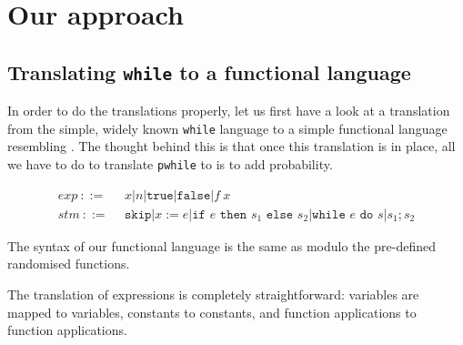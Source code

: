 \documentclass[11pt, leqno]{article}
\theoremstyle{definition}
\begin{document}




\section{Our approach}





\subsection{Translating \texttt{while} to a functional language}
% 
In order to do the translations properly, let us first have a look at a translation
from the simple, widely known \texttt{while} language to a simple functional language
resembling \rml. The thought behind this is that once this translation is in place,
all we have to do to translate \texttt{pwhile} to \rml is to add probability.

\begin{align}
  \label{eq:while}
  exp~  ::=~~ & x \vert n \vert \texttt{true} \vert \texttt{false} \vert f~x \\
  stm~  ::=~~ & \texttt{skip} \vert x := e
               \vert \texttt{if } e \texttt{ then } s_1 \texttt{ else } s_2
               \vert \texttt{while } e \texttt{ do } s \vert s_1;s_2
\end{align}

The syntax of our functional language is the same as \rml modulo the pre-defined
randomised functions.

The translation of expressions is completely straightforward: variables are mapped to
variables, constants to constants, and function applications to function applications. 
\end{document}
